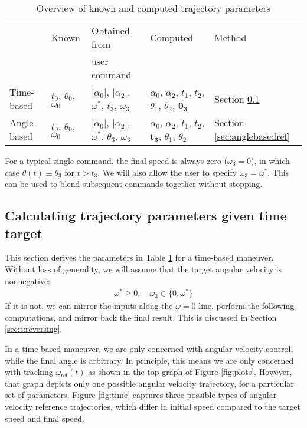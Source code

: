 \documentclass[12pt, a4paper]
{article}
\providecommand{\sub}[1]{_{\text{#1}}}
\providecommand{\w}{\omega}
\providecommand{\wt}{\w^*}
\providecommand{\wref}{\w\sub{ref}}
\renewcommand{\th}{\theta}
\renewcommand{\a}{\alpha}
\providecommand{\abs}[1]{\left|#1\right|}
\begin{document}
\begin{table}[H]
    \centering
    \caption{Overview of known and computed trajectory parameters}
    \label{tab:parameters}
    \begin{tabular}{@{}lllll@{}}
    \toprule
                & Known    & Obtained from & Computed & Method \\
                &          & user command  &          &        \\ \midrule
    Time-based  &
        $t_0$, $\th_0$, $\w_0$ &
        $\abs{\a_0}$, $\abs{\a_2}$, $\wt$, $t_3$, $\w_3$ &
        $\a_0$, $\a_2$, $t_1$, $t_2$, $\th_1$, $\th_2$, $\boldsymbol{\th_3}$
        & Section \ref{sec:timebasedref}\\
    Angle-based &
        $t_0$, $\th_0$, $\w_0$ &
        $\abs{\a_0}$, $\abs{\a_2}$, $\wt$, $\th_3$, $\w_3$ &
        $\a_0$, $\a_2$, $t_1$, $t_2$, $\boldsymbol{t_3}$, $\th_1$, $\th_2$ &
        Section \ref{sec:anglebasedref}  \\
        \bottomrule
    \end{tabular}
\end{table}

For a typical single command, the final speed is always zero ($\w_3 = 0$), in
which case $\th(t) \equiv \th_3$ for $t > t_3$. We will also allow the user to
specify $\w_3 = \wt$. This can be used to blend subsequent commands together
without stopping.


\subsection{Calculating trajectory parameters given time target}
\label{sec:timebasedref}
This section derives the parameters in Table \ref{tab:parameters} for a
time-based maneuver. Without loss of generality, we will assume that the
target angular velocity is nonnegative:
%
\begin{align}
    \label{eq:t:forwardmaneuver}
    \wt \geq 0, \quad \w_3 \in \{0, \wt\}
\end{align}
%
If it is not, we can mirror the inputs along the $\w=0$ line, perform the
following computations, and mirror back the final result. This is discussed
in Section \ref{sec:t:reversing}.

In a time-based maneuver, we are only concerned with angular velocity control,
while the final angle is arbitrary. In principle, this means we are only
concerned with tracking $\wref(t)$ as shown in the top graph of
Figure \ref{fig:plots}. However, that graph depicts only one possible angular
velocity trajectory, for a particular set of parameters.
Figure \ref{fig:time} captures three possible types of angular velocity
reference trajectories, which differ in initial speed compared to the
target speed and final speed.
\end{document}
